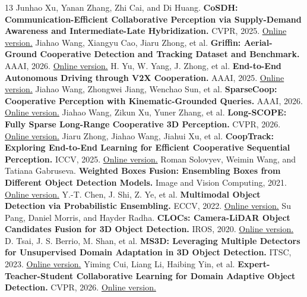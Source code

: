 \begin{thebibliography}{13}
 Junhao Xu, Yanan Zhang, Zhi Cai, and Di Huang. \textbf{CoSDH: Communication-Efficient Collaborative Perception via Supply-Demand Awareness and Intermediate-Late Hybridization.} CVPR, 2025. \href{https://openaccess.thecvf.com/content/CVPR2025/html/Xu_CoSDH_Communication-Efficient_Collaborative_Perception_via_Supply-Demand_Awareness_and_Intermediate-Late_Hybridization_CVPR_2025_paper.html}{Online version.}
 Jiahao Wang, Xiangyu Cao, Jiaru Zhong, et al. \textbf{Griffin: Aerial-Ground Cooperative Detection and Tracking Dataset and Benchmark.} AAAI, 2026. \href{https://doi.org/10.1609/aaai.v40i12.37951}{Online version.}
 H. Yu, W. Yang, J. Zhong, et al. \textbf{End-to-End Autonomous Driving through V2X Cooperation.} AAAI, 2025. \href{https://arxiv.org/abs/2404.00717}{Online version.}
 Jiahao Wang, Zhongwei Jiang, Wenchao Sun, et al. \textbf{SparseCoop: Cooperative Perception with Kinematic-Grounded Queries.} AAAI, 2026. \href{https://arxiv.org/abs/2512.06838}{Online version.}
 Jiahao Wang, Zikun Xu, Yuner Zhang, et al. \textbf{Long-SCOPE: Fully Sparse Long-Range Cooperative 3D Perception.} CVPR, 2026. \href{https://openaccess.thecvf.com/content/CVPR2026/html/Wang_Long-SCOPE_Fully_Sparse_Long-Range_Cooperative_3D_Perception_CVPR_2026_paper.html}{Online version.}
 Jiaru Zhong, Jiahao Wang, Jiahui Xu, et al. \textbf{CoopTrack: Exploring End-to-End Learning for Efficient Cooperative Sequential Perception.} ICCV, 2025. \href{https://arxiv.org/abs/2507.19239}{Online version.}
 Roman Solovyev, Weimin Wang, and Tatiana Gabruseva. \textbf{Weighted Boxes Fusion: Ensembling Boxes from Different Object Detection Models.} Image and Vision Computing, 2021. \href{https://arxiv.org/abs/1910.13302}{Online version.}
 Y.-T. Chen, J. Shi, Z. Ye, et al. \textbf{Multimodal Object Detection via Probabilistic Ensembling.} ECCV, 2022. \href{https://arxiv.org/abs/2104.02904}{Online version.}
 Su Pang, Daniel Morris, and Hayder Radha. \textbf{CLOCs: Camera-LiDAR Object Candidates Fusion for 3D Object Detection.} IROS, 2020. \href{https://arxiv.org/abs/2009.00784}{Online version.}
 D. Tsai, J. S. Berrio, M. Shan, et al. \textbf{MS3D: Leveraging Multiple Detectors for Unsupervised Domain Adaptation in 3D Object Detection.} ITSC, 2023. \href{https://arxiv.org/abs/2304.02431}{Online version.}
 Yiming Cui, Liang Li, Haibing Yin, et al. \textbf{Expert-Teacher-Student Collaborative Learning for Domain Adaptive Object Detection.} CVPR, 2026. \href{https://openaccess.thecvf.com/content/CVPR2026/html/Cui_Expert-Teacher-Student_Collaborative_Learning_for_Domain_Adaptive_Object_Detection_CVPR_2026_paper.html}{Online version.}

\end{thebibliography}
